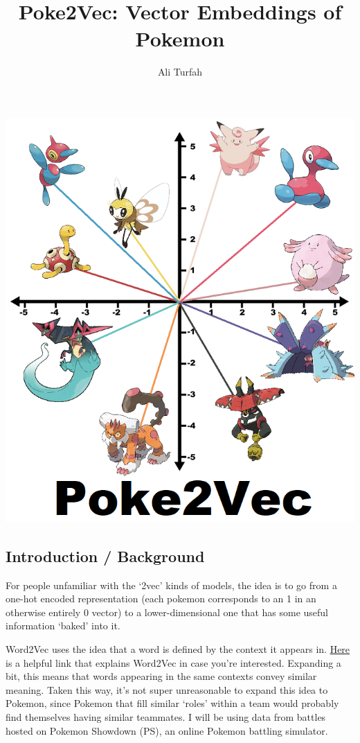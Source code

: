 \documentclass[]{article}
\title{Poke2Vec: Vector Embeddings of Pokemon}
\author{Ali Turfah}
\date{}
\begin{document}
\maketitle

\includegraphics{header.png}

\hypertarget{introduction-background}{%
\subsection{Introduction / Background}\label{introduction-background}}

For people unfamiliar with the `2vec' kinds of models, the idea is to go
from a one-hot encoded representation (each pokemon corresponds to an 1
in an otherwise entirely 0 vector) to a lower-dimensional one that has
some useful information `baked' into it.

Word2Vec uses the idea that a word is defined by the context it appears
in.
\href{https://israelg99.github.io/2017-03-23-Word2Vec-Explained/}{Here}
is a helpful link that explains Word2Vec in case you're interested.
Expanding a bit, this means that words appearing in the same contexts
convey similar meaning. Taken this way, it's not super unreasonable to
expand this idea to Pokemon, since Pokemon that fill similar `roles'
within a team would probably find themselves having similar teammates. I
will be using data from battles hosted on Pokemon Showdown (PS), an
online Pokemon battling simulator.
\end{document}
